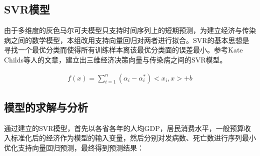 \documentclass{whutmod}
\begin{document}
  \subsection{SVR模型}   
  由于多维度的灰色马尔可夫模型只支持时间序列上的短期预测\cite{bib:5}，为建立经济与传染病之间的数学模型，本组改用支持向量回归对两者进行拟合。SVR的基本思想是寻找一个最优分类而使得所有训练样本离该最优分类面的误差最小。参考Kate Childs等人的文章\cite{bib:7}，建立出三维经济决策向量与传染病之间的SVR模型。
  
  \begin{gather}
  f(x)=\sum_{i=1}^{n}\left(\alpha_{i}-\alpha_{i}^{*}\right)<x_{i}, x>+b
  \end{gather}\label{svr}
  
  \subsection{模型的求解与分析}
  通过建立的SVR模型，首先以各省各年的人均GDP，居民消费水平，一般预算收入标准化后的经济作为模型的输入变量，然后分别对发病数、死亡数进行序列最小优化支持向量回归预测，最终得到预测结果：
  
\end{document}
